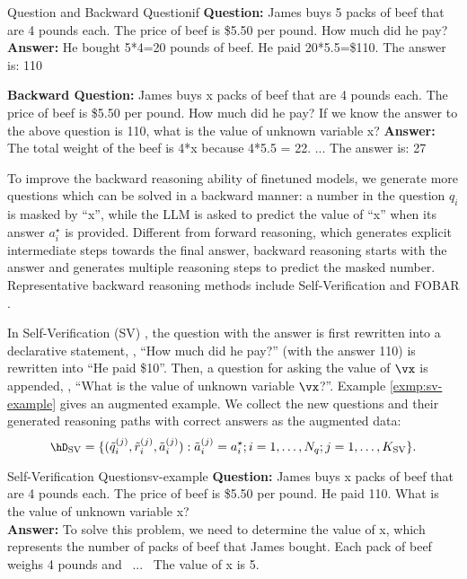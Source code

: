 \begin{exmp}{Question and Backward Question}{if}
    \small
    \textbf{Question:}
    James buys 5 packs of beef that are 4 pounds each. The price of beef is \$5.50 per pound. How much did he pay? \textbf{Answer:} He bought 5*4=20 pounds of beef. He paid 20*5.5=\$110. The answer is: 110 \textcolor{red}{{}}
    
    \textbf{Backward Question:}
    James buys x packs of beef that are 4 pounds each. The price of beef is \$5.50 per pound. How much did he pay? If we know the answer to the above question is 110, what is the value of unknown variable x? \textbf{Answer:} The total weight of the beef is 4*x because 4*5.5 = 22. ...  The answer is: 27 \textcolor{red}{}
\end{exmp}
\vspace{2.5mm}
   
 
	
To improve the backward reasoning ability of finetuned models,
we generate more questions which can be solved in a backward manner: 
a number in the question $q_i$ is masked by 
``x'',
while the LLM is asked to predict the 
value of ``x'' when its answer $a_i^\star$
is provided.
Different from forward reasoning,
which generates explicit intermediate steps towards the
final answer,
backward reasoning starts with the answer
and generates multiple reasoning steps 
to predict the masked number.
Representative backward reasoning methods
include 
Self-Verification \citep{weng2023large}
and FOBAR \citep{jiang2023backward}.

In Self-Verification (SV) \citep{weng2023large}, the question with the answer is first rewritten into a declarative statement, \eg, ``How much did he pay?'' (with the answer 110) is rewritten into ``He paid \$10''. 
Then, a question for asking the value of $\vx$ is appended, \eg, ``What is the value of unknown variable $\vx$?''. Example \ref{exmp:sv-example} gives an augmented example. We collect the new questions and their generated reasoning paths with correct answers as the augmented data:
\begin{equation}
\small
\hD_{\text{SV}} = \{(\tilde{q}_i^{(j)}, \tilde{r}_i^{(j)}, \tilde{a}_i^{(j)}): \tilde{a}_i^{(j)} = a_i^\star;  i=1,\dots, N_q; j=1,\dots, K_{\text{SV}}\}.
\end{equation}

\vspace{2.5mm}
\begin{exmp}{Self-Verification \citep{weng2023large} Question}{sv-example}
\small
\textbf{Question:} James buys {\color{red3}x} packs of beef that are 4 pounds each.  The price of beef is \$5.50 per pound. He paid 110.
{\color{red3}What is the value of unknown variable x?} \\
\textbf{Answer:} 
To solve this problem, we need to determine the value of x, which represents the number of packs of beef that James bought.
Each pack of beef weighs 4 pounds and 
~...~
The value of x is 5.
\end{exmp}
\vspace{5mm}

